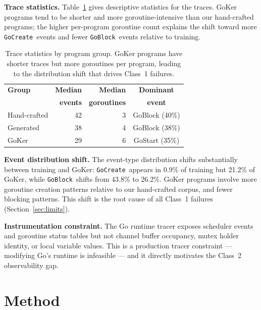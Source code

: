 \documentclass[10pt,conference]{IEEEtran}
\newcommand{\eblock}{\texttt{GoBlock}}
\newcommand{\ecreate}{\texttt{GoCreate}}
\begin{document}
\textbf{Trace statistics.}
Table~\ref{tab:tracestats} gives descriptive statistics for the traces.
GoKer programs tend to be shorter and more goroutine-intensive than
our hand-crafted programs; the higher per-program goroutine count
explains the shift toward more \ecreate\ events and fewer \eblock\
events relative to training.

\begin{table}[t]
\centering
\caption{Trace statistics by program group.
GoKer programs have shorter traces but more goroutines per program,
leading to the distribution shift that drives Class~1 failures.}
\label{tab:tracestats}
\vspace*{8pt}
\small
\begin{tabular}{@{}lrrc@{}}
\toprule
\textbf{Group} & \textbf{Median} & \textbf{Median} & \textbf{Dominant}\\
               & \textbf{events} & \textbf{goroutines} & \textbf{event}\\
\midrule
Hand-crafted & 42  & 3 & GoBlock (40\%)\\
Generated    & 38  & 4 & GoBlock (38\%)\\
GoKer        & 29  & 6 & GoStart (35\%)\\
\bottomrule
\end{tabular}
\end{table}

\textbf{Event distribution shift.}
The event-type distribution shifts substantially between training and
GoKer: \ecreate\ appears in 0.9\% of training but 21.2\% of GoKer,
while \eblock\ shifts from 43.8\% to 26.2\%.
GoKer programs involve more goroutine creation patterns relative to our
hand-crafted corpus, and fewer blocking patterns.
This shift is the root cause of all Class~1 failures
(Section~\ref{sec:limits}).

\textbf{Instrumentation constraint.}
The Go runtime tracer exposes scheduler events and goroutine status
tables but not channel buffer occupancy, mutex holder identity, or local
variable values.
This is a production tracer constraint — modifying Go's runtime is
infeasible — and it directly motivates the Class~2 observability gap.

\section{Method}\label{sec:method}
\end{document}
